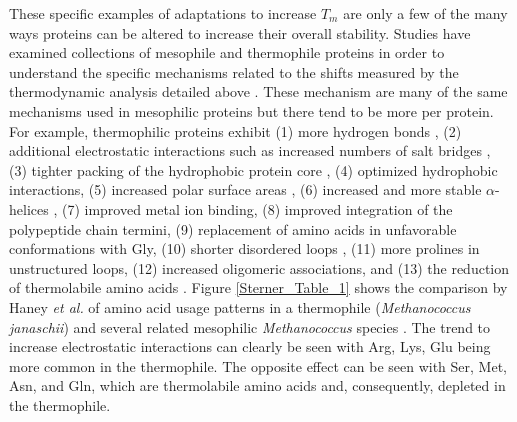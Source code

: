 

These specific examples of adaptations to increase ${T}_{m}$ are only a few of
the many ways proteins can be altered to increase their overall stability.
Studies have examined collections of mesophile and thermophile proteins in
order to understand the specific mechanisms related to the shifts measured by
the thermodynamic analysis detailed above \cite{jaenicke1998spe}.  These
mechanism are many of the same mechanisms used in mesophilic proteins but there
tend to be more per protein.  For example, thermophilic proteins exhibit (1)
more hydrogen bonds \cite{PMID_11577980}, (2) additional electrostatic
interactions such as increased numbers of salt bridges \cite{beeby_31,PMID_10097079},
(3) tighter packing of the hydrophobic protein core \cite{beeby_29}, (4)
optimized hydrophobic interactions, (5) increased polar surface areas
\cite{PMID_10940293}, (6) increased and more stable $\alpha$-helices
\cite{PMID_11577980}, (7) improved metal ion binding, (8) improved integration
of the polypeptide chain termini, (9) replacement of amino acids in unfavorable
conformations with Gly, (10) shorter disordered loops \cite{thompson1999tel},
(11) more prolines in unstructured loops, (12) increased oligomeric
associations, and (13) the reduction of thermolabile amino acids
\cite{PMID_11577980,PMID_10097079}. Figure \ref{Sterner_Table_1} shows the
comparison by Haney \emph{et al.} of amino acid usage patterns in a thermophile
(\emph{Methanococcus janaschii}) and several related mesophilic
\emph{Methanococcus} species \cite{PMID_10097079}.  The trend to increase electrostatic interactions
can clearly be seen with Arg, Lys, Glu being more common in the thermophile.
The opposite effect can be seen with Ser, Met, Asn, and Gln, which are
thermolabile amino acids and, consequently, depleted in the thermophile.

